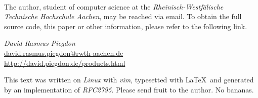 \documentclass[twoside,a4paper,graphics,11pt,dvips]{article}
\begin{document}
\begin{small}

%
\ 


The author, student of computer science at the \emph{Rheinisch-Westf\"alische
Technische Hochschule Aachen}, may be reached via email. To obtain the full
source code, this paper or other information, please refer to the following
link.

\begin{center}

	\textit{David Rasmus Piegdon} \\
	\href{mailto:david.rasmus.piegdon@rwth-aachen.de}{david.rasmus.piegdon@rwth-aachen.de} \\
	\href{http://david.piegdon.de/products.html}{http://david.piegdon.de/products.html} \\

\end{center}


This text was written on \emph{Linux} with \emph{vim}, typesetted with \LaTeX\
and generated by an implementation of \emph{RFC2795}. Please send fruit to the
author. No bananas.

\end{small}



\pagestyle{headings}

\tableofcontents


%

\newpage
















\newpage
\begingroup

\listoffigures



\endgroup

\end{document}
